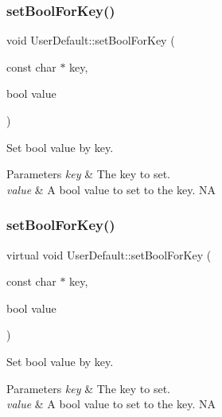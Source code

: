 \subsubsection{\texorpdfstring{set\+Bool\+For\+Key()}{setBoolForKey()}\hspace{0.1cm}{\footnotesize\ttfamily [1/2]}}
{\footnotesize\ttfamily void User\+Default\+::set\+Bool\+For\+Key (\begin{DoxyParamCaption}\item[{const char $\ast$}]{key,  }\item[{bool}]{value }\end{DoxyParamCaption})\hspace{0.3cm}{\ttfamily [virtual]}}

Set bool value by key. 
\begin{DoxyParams}{Parameters}
{\em key} & The key to set. \\
\hline
{\em value} & A bool value to set to the key.  NA \\
\hline
\end{DoxyParams}
\mbox{\label{classUserDefault_a519cfd627086d25fd6aa8c4518f4f4d9}} 
\subsubsection{\texorpdfstring{set\+Bool\+For\+Key()}{setBoolForKey()}\hspace{0.1cm}{\footnotesize\ttfamily [2/2]}}
{\footnotesize\ttfamily virtual void User\+Default\+::set\+Bool\+For\+Key (\begin{DoxyParamCaption}\item[{const char $\ast$}]{key,  }\item[{bool}]{value }\end{DoxyParamCaption})\hspace{0.3cm}{\ttfamily [virtual]}}

Set bool value by key. 
\begin{DoxyParams}{Parameters}
{\em key} & The key to set. \\
\hline
{\em value} & A bool value to set to the key.  NA \\
\hline
\end{DoxyParams}
\mbox{\label{classUserDefault_ae051a204ff32348f56a535d4edf2d77e}} 
